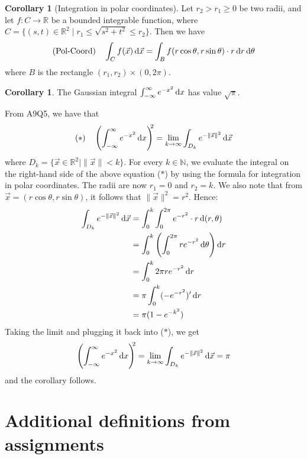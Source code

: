 \documentclass[11pt]{article}
\makeatletter
\theoremstyle{definition}
\newtheorem{cor}[thm]{Corollary}
\newcommand{\N}{\ensuremath{\mathbb{N}}}
\newcommand{\R}{\ensuremath{\mathbb{R}}}
\newenvironment{pf}[1][\proofname]{\par
  \pushQED{\qed}%
  \normalfont \topsep0\p@\relax
  \trivlist
  \item[\hskip\labelsep\itshape
  #1\@addpunct{.}]\ignorespaces
}{%
  \popQED\endtrivlist\@endpefalse
}
\makeatother
\begin{document}
\begin{cor}[Integration in polar coordinates]
Let $r_2 > r_1 \geq 0$ be two radii, and let $f : C \to \R$ be a bounded integrable function, where $C = \{(s, t) \in \R^2 \mid r_1 \leq \sqrt{s^2+t^2} \leq r_2\}$. Then we have
$$\text{(Pol-Coord)} \quad \int_C f(\vec{x})\,{\rm d}\vec{x} = \int_B f(r\cos\theta, r\sin\theta) \cdot r\,{\rm d}r\,{\rm d}\theta$$
where $B$ is the rectangle $(r_1, r_2) \times (0, 2\pi)$.
\end{cor}

\begin{cor}
The Gaussian integral $\int_{-\infty}^\infty e^{-x^2}\,{\rm d}x$ has value $\sqrt\pi$.
\begin{pf}
From A9Q5, we have that
$$(*) \quad \left(\int_{-\infty}^\infty e^{-x^2}\,{\rm d}x\right)^{\hspace{-0.8ex}2} = \lim_{k\to\infty} \int_{D_k} e^{-\|\vec{x}\|^2}\,{\rm d}\vec{x}$$
where $D_k = \{\vec{x} \in \R^2 \mid \|\vec{x}\| < k\}$. For every $k \in \N$, we evaluate the integral on the right-hand side of the above equation ($*$) by using the formula for integration in polar coordinates. The radii are now $r_1 = 0$ and $r_2 = k$. We also note that from $\vec{x} = (r\cos\theta, r\sin\theta)$, it follows that $\|\vec{x}\|^2 = r^2$. Hence:
\begin{align*}
    \int_{D_k} e^{-\|\vec{x}\|^2}\,{\rm d}\vec{x}
    &= \int_0^k \int_0^{2\pi} e^{-r^2} \cdot r\,{\rm d}(r, \theta) \\
    &= \int_0^k \left( \int_0^{2\pi} re^{-r^2}\,{\rm d}\theta \right) {\rm d}r \\
    &= \int_0^k 2\pi re^{-r^2}\,{\rm d}r \\
    &= \pi \int_0^k (-e^{-r^2})'\,{\rm d}r \\
    &= \pi(1 - e^{-k^2})
\end{align*}
Taking the limit and plugging it back into ($*$), we get
$$\left(\int_{-\infty}^\infty e^{-x^2}\,{\rm d}x\right)^{\hspace{-0.8ex}2} = \lim_{k\to\infty} \int_{D_k} e^{-\|\vec{x}\|^2}\,{\rm d}\vec{x} = \pi$$
and the corollary follows.
\end{pf}
\end{cor}

\newpage
{}
\section*{Additional definitions from assignments}
\end{document}
